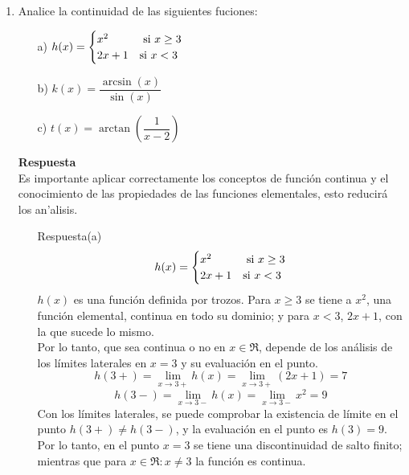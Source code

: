 \documentclass[10pt,twoside]{SelfArx} %
\begin{document}
\begin{enumerate}
\begin{enumerate}
	\item[Respuesta(c)]
	\[ \lim\limits_{x\rightarrow0}\frac{x^{2}-1}{2x^{2}-x-1} \]
	aplicando propiedades de los límites
	\[ \lim\limits_{x\rightarrow0}\frac{x^{2}-1}{2x^{2}-x-1}=\frac{\lim\limits_{x\rightarrow0}(x^{2}-1)}{\lim\limits_{x\rightarrow0}(2x^{2}-x-1)} \]
	\[ =\frac{\lim\limits_{x\rightarrow0}x^{2}-\lim\limits_{x\rightarrow0}1}{\lim\limits_{x\rightarrow0}2x^{2}-\lim\limits_{x\rightarrow0}x-\lim\limits_{x\rightarrow0}1}
	=\dfrac{-1}{-1}=1 \]
\end{enumerate}
	\item	Analice la continuidad de las siguientes fuciones: %
			\begin{enumerate}
				\item[a)]	$ h(x)=\begin{cases}
				x^{2} & \hbox{ si $ x\geq3 $}\\
				2x+1 & \hbox{si $ x<3 $}
				\end{cases} $
				\item[b)]	$ k(x)=\dfrac{\arcsin(x)}{\sin(x)} $
				\item[c)]	$ t(x)=\arctan(\dfrac{1}{x-2}) $
			\end{enumerate}
\textbf{Respuesta}			%
\\
Es importante aplicar correctamente los conceptos de funci\'on continua y el conocimiento de las propiedades de las funciones elementales, esto reducir\'a los an'alisis.
\begin{enumerate}
	\item[Respuesta(a)]	
	\[ h(x)=\begin{cases}
	x^{2} & \hbox{ si $ x\geq3 $}\\
	2x+1 & \hbox{si $ x<3 $}
	\end{cases} \]
	$ h(x) $ es una función definida por trozos. Para $ x\geq3 $ se tiene a $ x^{2} $, una función elemental, continua en todo su dominio; y para $ x<3 $, $ 2x+1 $, con la que sucede lo mismo. \\
	Por lo tanto, que sea continua o no en $ x\in\Re $, depende de los an\'alisis de los l\'imites laterales en $ x=3 $ y su evaluaci\'on en el punto.\\
	\[ h(3+)=\lim\limits_{x\rightarrow3+}h(x)=\lim\limits_{x\rightarrow3+}(2x+1)=7 \]
	\[ h(3-)=\lim\limits_{x\rightarrow3-}h(x)=\lim\limits_{x\rightarrow3-}x^{2}=9 \]
	Con los límites laterales, se puede comprobar la existencia de límite en el punto $ h(3+)\neq h(3-) $,  y la evaluaci\'on en el punto es $ h(3)=9 $.\\
	Por lo tanto, en el punto $ x=3 $ se tiene una discontinuidad de salto finito; mientras que para $ {x\in\Re: x\neq3} $ la función es continua.
	

\end{enumerate}
\end{enumerate}
\end{document}
